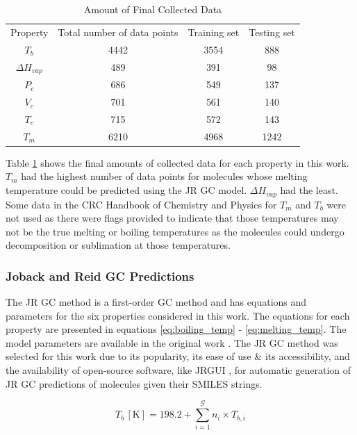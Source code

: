 \documentclass[journal=jacsat,manuscript=article, ]{achemso}
\begin{document}
\begin{table}
    \centering
    \begin{tabular}{cccc}
         Property&  Total number of data points&  Training set& Testing set
         
\\
         $T_b$&  4442&  3554& 888
\\
         $\Delta H_{vap}$&  489&  391& 98
\\
         $P_c$&  686&  549& 137
\\
         $V_c$&  701&  561& 140
\\
         $T_c$&  715&  572& 143
\\
         $T_m$&  6210&  4968& 1242
\\
    \end{tabular}
    \caption{Amount of Final Collected Data}
    \label{tab:collected_data}
\end{table}

Table \ref{tab:collected_data} shows the final amounts of collected data for each property in this work. $T_m$ had the highest number of data points for molecules whose melting temperature could be predicted using the JR GC model.
$\Delta H_{vap}$ had the least. 
Some data in the CRC Handbook of Chemistry and Physics for $T_m$ and $T_b$ were not used as there were flags provided to indicate that those temperatures may not be the true melting or boiling temperatures as the molecules could undergo decomposition or sublimation at those temperatures. 

\subsubsection{Joback and Reid GC Predictions}
The JR GC method is a first-order GC method and has equations and parameters for the six properties considered in this work. The equations for each property are presented in equations \ref{eq:boiling_temp} - \ref{eq:melting_temp}. The model parameters are available in the original work \cite{jobackEstimationPureComponentProperties1987}.
The JR GC method was selected for this work due to its popularity, its ease of use \& its accessibility, and the availability of open-source software, like JRGUI \cite{shiJRguiPythonProgram2017}, for automatic generation of JR GC predictions of molecules given their SMILES strings.

\begin{equation}
    T_b \, [\text{K}] = 198.2 + \sum_{i=1}^{\mathcal{G}} n_{i} \times T_{b,i}
    \label{eq:boiling_temp}
\end{equation}
\end{document}

